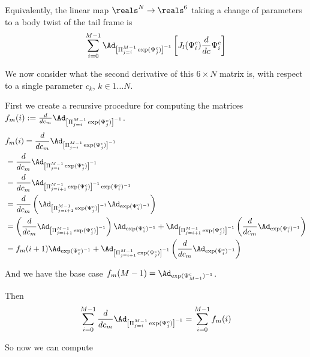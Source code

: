 \documentclass[12pt]{article}
\begin{document}
Equivalently, the linear map $\reals^N \rightarrow \reals^6$ taking a change of parameters to a body twist of the tail frame is 
$$\sum_{i=0}^{M-1}\Ad_{\left[\Pi_{j=i}^{M-1} \exp(\Psi^c_j)\right]^{-1}}\left[J_l(\Psi^c_i)\frac{d}{dc}\Psi^c_i \right]$$

We now consider what the second derivative of this $6 \times N$ matrix is, with respect to a single parameter $c_k$, $k \in 1 \ldots N$.

First we create a recursive procedure for computing the matrices $f_m(i) := \frac{d}{dc_m}\Ad_{\left[\Pi_{j=i}^{M-1} \exp(\Psi^c_j)\right]^{-1}}$.
\[
  \begin{aligned}
    &f_m(i) = \frac{d}{dc_m}\Ad_{\left[\Pi_{j=i}^{M-1} \exp(\Psi^c_j)\right]^{-1}} \\
    &= \frac{d}{dc_m}\Ad_{\left[\Pi_{j=i}^{M-1} \exp(\Psi^c_j)\right]^{-1}} \\
    &= \frac{d}{dc_m}\Ad_{\left  [\Pi_{j=i+1}^{M-1} \exp(\Psi^c_j)\right]^{-1} \exp(\Psi^c_{i})^{-1}} \\
    &= \frac{d}{dc_m}\left(\Ad_{\left  [\Pi_{j=i+1}^{M-1} \exp(\Psi^c_j)\right]^{-1}}\Ad_{ \exp(\Psi^c_{i})^{-1}} \right)\\
    &= \left(\frac{d}{dc_m}\Ad_{\left  [\Pi_{j=i+1}^{M-1} \exp(\Psi^c_j)\right]^{-1}}\right)\Ad_{ \exp(\Psi^c_{i})^{-1}} + \Ad_{\left  [\Pi_{j=i+1}^{M-1} \exp(\Psi^c_j)\right]^{-1}}\left(\frac{d}{dc_m}\Ad_{ \exp(\Psi^c_{i})^{-1}}\right) \\
    &= f_m(i+1) \Ad_{ \exp(\Psi^c_{i})^{-1}} + \Ad_{\left  [\Pi_{j=i+1}^{M-1} \exp(\Psi^c_j)\right]^{-1}} \left(\frac{d}{dc_m}\Ad_{ \exp(\Psi^c_{i})^{-1}}\right) 
  \end{aligned}
\]

And we have the base case $f_m(M-1) = \Ad_{ \exp(\Psi^c_{M-1})^{-1}}$.

Then
\[
  \begin{aligned}
    \sum_{i=0}^{M-1} \frac{d}{dc_m}\Ad_{\left[\Pi_{j=i}^{M-1} \exp(\Psi^c_j)\right]^{-1}} = \sum_{i=0}^{M-1} f_m(i)\\
  \end{aligned}
\]

So now we can compute
\end{document}
